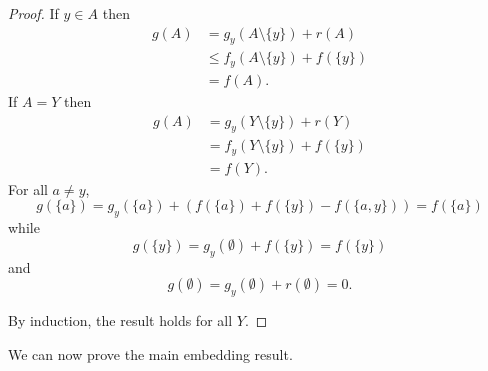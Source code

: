 \documentclass{article}
\theoremstyle{plain}
\theoremstyle{definition}
\begin{document}
\begin{proof}
  If $y \in A$ then
  \begin{align*}
  g(A) & = g_y(A \setminus \{y\}) + r(A) \\
  & \leq f_y(A \setminus \{y\}) + f(\{y\}) \\
  & = f(A).
  \end{align*}
  If $A = Y$ then 
  \begin{align*}
  g(A) & = g_y(Y \setminus \{y\}) + r(Y) \\
  & = f_y(Y \setminus \{y\}) + f(\{y\})\\
  & = f(Y).
  \end{align*}
  For all $a \neq y$,
   \[g(\{a\}) = g_y(\{a\}) + \left( f(\{a\}) + f(\{y\}) - f(\{a,y\})  \right) = f(\{a\})\]
  while
   \[g(\{y\}) = g_y(\emptyset) + f(\{y\}) = f(\{y\})\]
and
\[g(\emptyset) =  g_y(\emptyset) + r(\emptyset) = 0.\]  
 
  By induction, the result holds for all $Y$. 
  \end{proof}

We can now prove the main embedding result. 
\end{document}
